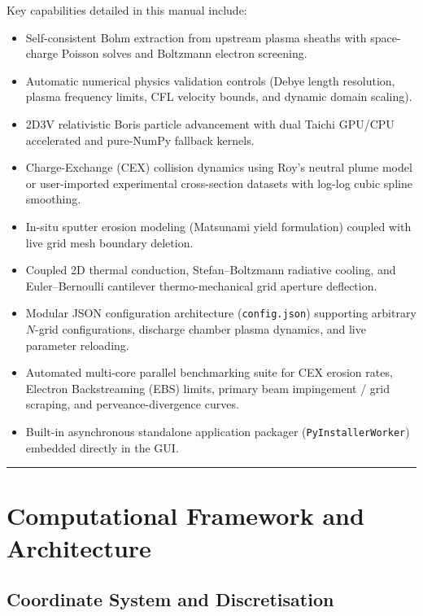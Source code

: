\documentclass[11pt,a4paper]{article}
\begin{document}
Key capabilities detailed in this manual include:
\begin{itemize}[nosep]
    \item Self-consistent Bohm extraction from upstream plasma sheaths with space-charge Poisson solves and Boltzmann electron screening.
    \item Automatic numerical physics validation controls (Debye length resolution, plasma frequency limits, CFL velocity bounds, and dynamic domain scaling).
    \item 2D3V relativistic Boris particle advancement with dual Taichi GPU/CPU accelerated and pure-NumPy fallback kernels.
    \item Charge-Exchange (CEX) collision dynamics using Roy's neutral plume model or user-imported experimental cross-section datasets with log-log cubic spline smoothing.
    \item In-situ sputter erosion modeling (Matsunami yield formulation) coupled with live grid mesh boundary deletion.
    \item Coupled 2D thermal conduction, Stefan--Boltzmann radiative cooling, and Euler--Bernoulli cantilever thermo-mechanical grid aperture deflection.
    \item Modular JSON configuration architecture (\texttt{config.json}) supporting arbitrary $N$-grid configurations, discharge chamber plasma dynamics, and live parameter reloading.
    \item Automated multi-core parallel benchmarking suite for CEX erosion rates, Electron Backstreaming (EBS) limits, primary beam impingement / grid scraping, and perveance-divergence curves.
    \item Built-in asynchronous standalone application packager (\texttt{PyInstallerWorker}) embedded directly in the GUI.
\end{itemize}

\vspace{1em}
\hrule
\vspace{1em}

\tableofcontents
\newpage

\section{Computational Framework and Architecture}

\subsection{Coordinate System and Discretisation}
\end{document}
